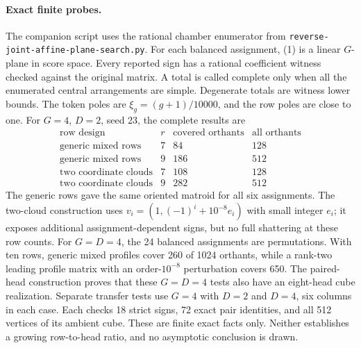 \documentclass[11pt]{article}
\begin{document}
\paragraph{Exact finite probes.}
The companion script uses the rational chamber enumerator from
\texttt{reverse-joint-affine-plane-search.py}. For each balanced
assignment, (1) is a linear $G$-plane in score space. Every reported sign
has a rational coefficient witness checked against the original
matrix. A total is called complete only when all the enumerated central
arrangements are simple. Degenerate totals are witness lower bounds.
The token poles are $\xi_g=(g+1)/10000$, and the row poles are close to
one. For $G=4$, $D=2$, seed 23, the complete results are
\[
\begin{array}{c|r|r|r}
\text{row design}&r&\text{covered orthants}&\text{all orthants}\\\hline
\text{generic mixed rows}&7&84&128\\
\text{generic mixed rows}&9&186&512\\
\text{two coordinate clouds}&7&108&128\\
\text{two coordinate clouds}&9&282&512
\end{array}
\]
The generic rows gave the same oriented matroid for all six assignments.
The two-cloud construction uses
$v_i=(1,(-1)^i+10^{-8}e_i)$ with small integer $e_i$; it exposes additional
assignment-dependent signs, but no full shattering at these row counts.
For $G=D=4$, the 24 balanced assignments are permutations. With ten rows,
generic mixed profiles cover 260 of 1024 orthants, while a rank-two
leading profile matrix with an order-$10^{-8}$ perturbation covers 650.
The paired-head construction proves that these $G=D=4$ tests also have
an eight-head cube realization. Separate transfer tests use $G=4$ with
$D=2$ and $D=4$, six columns in each case. Each checks 18 strict signs,
72 exact pair identities, and all 512 vertices of its ambient cube.
These are finite exact facts only. Neither establishes a growing
row-to-head ratio, and no asymptotic conclusion is drawn.
\end{document}
